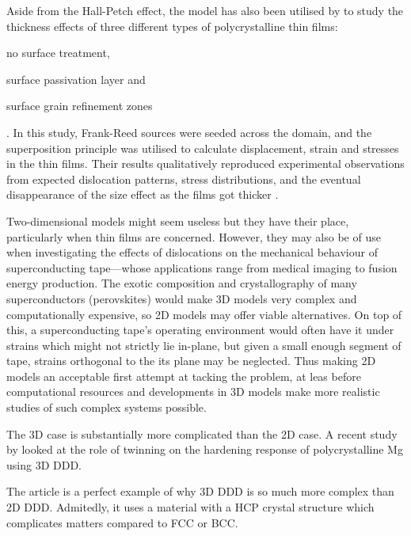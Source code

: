 Aside from the Hall-Petch effect, the model has also been utilised by \cite{2d_pcm2} to study the thickness effects of three different types of polycrystalline thin films:
\begin{inparaenum}[\itshape 1\upshape )]
    \item no surface treatment,
    \item surface passivation layer and
    \item surface grain refinement zones
\end{inparaenum}. In this study, Frank-Reed sources were seeded across the domain, and the superposition principle was utilised to calculate displacement, strain and stresses in the thin films. Their results qualitatively reproduced experimental observations from expected dislocation patterns, stress distributions, and the eventual disappearance of the size effect as the films got thicker \cite{2d_pcm2}.

Two-dimensional models might seem useless but they have their place, particularly when thin films are concerned. However, they may also be of use when investigating the effects of dislocations on the mechanical behaviour of superconducting tape---whose applications range from medical imaging to fusion energy production. The exotic composition and crystallography of many superconductors (perovskites) would make 3D models very complex and computationally expensive, so 2D models may offer viable alternatives. On top of this, a superconducting tape's operating environment would often have it under strains which might not strictly lie in-plane, but given a small enough segment of tape, strains orthogonal to the its plane may be neglected. Thus making 2D models an acceptable first attempt at tacking the problem, at leas before computational resources and developments in 3D models make more realistic studies of such complex systems possible.

The 3D case is substantially more complicated than the 2D case. A recent study by \citet{twinning} looked at the role of twinning on the hardening response of polycrystalline Mg using 3D DDD.

The article is a perfect example of why 3D DDD is so much more complex than 2D DDD. Admitedly, it uses a material with a HCP crystal structure which complicates matters compared to FCC or BCC.

